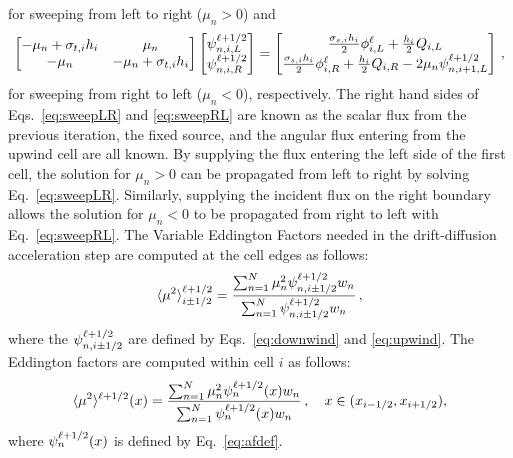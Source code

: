 for sweeping from left to right ($\mu_n > 0$) and 
	\begin{equation} \label{eq:sweepRL}
		\left[\begin{matrix} 
			-\mu_n + \sigma_{t,i}h_i & \mu_n \\ 
			-\mu_n & -\mu_n + \sigma_{t,i}h_i \\ 
		\end{matrix} \right]
		\left[\begin{matrix}
			\psi_{n,i,L}^{\ell+1/2} \\ \psi_{n,i,R}^{\ell+1/2}
		\end{matrix} \right]
		= \left[\begin{matrix}
			\frac{\sigma_{s,i}h_i}{2} \phi_{i,L}^\ell + \frac{h_i}{2} Q_{i,L} \\ 
			\frac{\sigma_{s,i}h_i}{2} \phi_{i,R}^\ell + \frac{h_i}{2} Q_{i,R} - 2\mu_n \psi_{n,i+1,L}^{\ell+1/2}
		\end{matrix} \right]
		\,, 
	\end{equation}
for sweeping from right to left ($\mu_n < 0$), respectively. The right hand sides of Eqs.~\ref{eq:sweepLR} and \ref{eq:sweepRL} are known 
as the scalar flux from the previous iteration, the fixed source, and the angular flux entering from the upwind cell are all known. By supplying the flux entering the left side of the first cell, the solution for $\mu_n > 0$ can be propagated from left to right by solving Eq.~\ref{eq:sweepLR}. Similarly, supplying the incident flux on the right boundary allows the solution for $\mu_n < 0$ to be propagated from right to left with Eq.~\ref{eq:sweepRL}. The Variable Eddington Factors needed in the drift-diffusion acceleration step are computed at the cell edges as follows: 
	\begin{equation} \label{lldg:edde}
		\langle \mu^2 \rangle^{\ell+1/2}_{i\pm 1/2} = \frac{
			\sum_{n=1}^N \mu_n^2 \psi_{n,i\pm 1/2}^{\ell+1/2} w_n
		}{
			\sum_{n=1}^N \psi_{n,i\pm 1/2}^{\ell+1/2} w_n 
		} \,,
	\end{equation}
where the $\psi_{n,i\pm1/2}^{\ell+1/2}$ are defined by Eqs.~\ref{eq:downwind} and \ref{eq:upwind}. The Eddington factors are 
computed within cell $i$ as follows:
\begin{equation} \label{lldg:eddi}
		\langle \mu^2 \rangle^{\ell+1/2}(x) = \frac{
			\sum_{n=1}^N \mu_n^2 \psi_{n}^{\ell+1/2}(x) w_n
		}{
			\sum_{n=1}^N \psi_{n}^{\ell+1/2}(x) w_n 
		} \,, \quad x\in(x_{i-1/2},x_{i+1/2}),
	\end{equation}
where $\psi_{n}^{\ell+1/2}(x)$ is defined by Eq.~\ref{eq:afdef}.
